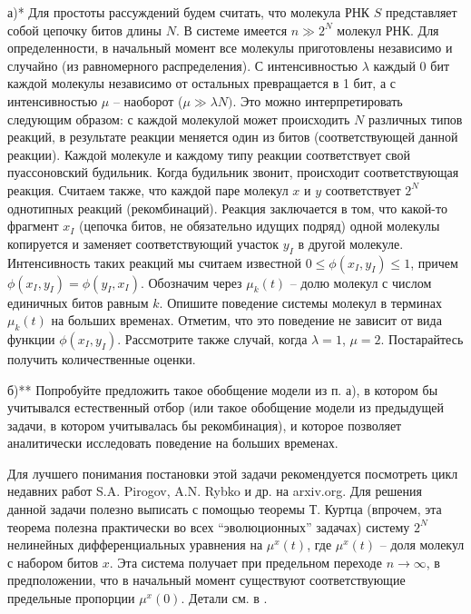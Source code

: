 \begin{problem}  

а)* Для простоты рассуждений будем считать, что молекула РНК $S$ представляет собой 
цепочку битов длины $N$. В системе имеется $n\gg 2^N$ молекул РНК. Для 
определенности, в начальный момент все молекулы приготовлены независимо и 
случайно (из равномерного распределения). С интенсивностью $\lambda $ каждый 
0 бит каждой молекулы независимо от остальных превращается в 1 бит, а с 
интенсивностью $\mu $ -- наоборот ($\mu \gg \lambda N)$. Это можно 
интерпретировать следующим образом: с каждой молекулой может происходить $N$ различных типов 
реакций, в результате реакции меняется один из битов (соответствующей данной 
реакции). Каждой молекуле и каждому типу реакции соответствует свой 
пуассоновский будильник. Когда будильник звонит, происходит соответствующая 
реакция. Считаем также, что каждой паре молекул $x$ и $y$ соответствует 
$2^N$ однотипных реакций (рекомбинаций). Реакция заключается в том, что 
какой-то фрагмент $x_I $ (цепочка битов, не обязательно идущих подряд) одной 
молекулы копируется и заменяет соответствующий участок $y_I $ в другой 
молекуле. Интенсивность таких реакций мы считаем известной $0\le \phi \left( 
{x_I ,y_I } \right)\le 1$, причем $\phi \left( {x_I ,y_I } \right)=\phi 
\left( {y_I ,x_I } \right)$. Обозначим через $\mu _k \left( t \right)$ -- 
долю молекул с числом единичных битов равным $k$. Опишите поведение системы 
молекул в терминах $\mu _k \left( t \right)$ на больших временах. Отметим, 
что это поведение не зависит от вида функции $\phi \left( {x_I ,y_I } 
\right)$. Рассмотрите также случай, когда $\lambda =1$, $\mu =2$. 
Постарайтесь получить количественные оценки. 

б)** Попробуйте предложить такое обобщение модели из п. а), в 
котором бы учитывался естественный отбор (или такое обобщение модели из 
предыдущей задачи, в котором учитывалась бы рекомбинация), и которое 
позволяет аналитически исследовать поведение на больших временах.
\end{problem}


\begin{remark}
 Для лучшего понимания постановки этой задачи 
рекомендуется посмотреть цикл недавних работ S.A. Pirogov, A.N. Rybko и др. 
на arxiv.org. Для решения данной задачи полезно выписать с 
помощью теоремы Т. Куртца (впрочем, эта теорема полезна практически во всех 
``эволюционных'' задачах) систему $2^N$ нелинейных дифференциальных 
уравнения на $\mu ^x\left( t \right)$, где $\mu ^x\left( t \right)$ -- доля 
молекул с набором битов $x$. Эта система получает при предельном переходе 
$n\to \infty $, в предположении, что в начальный момент существуют 
соответствующие предельные пропорции $\mu ^x\left( 0 \right)$. Детали см. в \cite{101}.
\end{remark}

